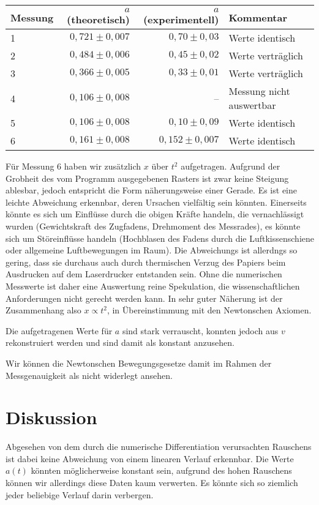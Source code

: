 \documentclass[a4paper,german,12pt,smallheadings]{scrartcl}
\begin{document}
\vspace{0.7cm}

\begin{tabular}{l|r|r|l}
  Messung & $a$ (theoretisch) & $a$ (experimentell) & Kommentar \\
  \hline
  1 & $0{,}721\pm0{,}007$ & $0{,}70\pm0{,}03$ & Werte identisch \\
  2 & $0{,}484\pm0{,}006$ & $0{,}45\pm0{,}02$ & Werte verträglich \\
  3 & $0{,}366\pm0{,}005$ & $0{,}33\pm0{,}01$ & Werte verträglich \\
  4 & $0{,}106\pm0{,}008$ & -- & Messung nicht auswertbar \\
  5 & $0{,}106\pm0{,}008$ & $0{,}10\pm0{,}09$ & Werte identisch \\
  6 & $0{,}161\pm0{,}008$ & $0{,}152\pm0{,}007$ & Werte identisch
\end{tabular}

\vspace{0.7cm}

Für Messung 6 haben wir zusätzlich $x$ über $t^2$ aufgetragen. Aufgrund der
Grobheit des vom Programm ausgegebenen Rasters ist zwar keine Steigung
ablesbar, jedoch entspricht die Form näherungsweise einer Gerade. Es ist eine
leichte Abweichung erkennbar,
deren Ursachen vielfältig sein könnten. Einerseits könnte es sich um Einflüsse
durch die obigen Kräfte handeln, die vernachlässigt wurden (Gewichtskraft des
Zugfadens, Drehmoment des Messrades), es könnte sich um Störeinflüsse handeln
(Hochblasen des Fadens durch die Luftkissenschiene oder allgemeine
Luftbewegungen im Raum). Die Abweichungs ist allerdngs so gering, dass sie
durchaus auch durch thermischen Verzug des Papiers beim Ausdrucken auf dem
Laserdrucker entstanden sein. Ohne die numerischen Messwerte ist daher eine
Auswertung reine Spekulation, die wissenschaftlichen Anforderungen nicht
gerecht werden kann. In sehr guter Näherung ist der Zusammenhang also $x \propto
t^2$, in Übereinstimmung mit den Newtonschen Axiomen.

Die aufgetragenen Werte für $a$ sind stark verrauscht, konnten jedoch aus $v$
rekonstruiert werden und sind damit als konstant anzusehen.

Wir können die Newtonschen Bewegungsgesetze damit im Rahmen der Messgenauigkeit
als nicht widerlegt ansehen.


\section*{Diskussion}
Abgesehen
von dem durch die numerische Differentiation verursachten Rauschens ist dabei
keine Abweichung von einem linearen Verlauf erkennbar. Die Werte $a(t)$ könnten
möglicherweise konstant sein, aufgrund des hohen Rauschens können wir
allerdings diese Daten kaum verwerten. Es könnte sich so ziemlich jeder
beliebige Verlauf darin verbergen.
\end{document}
